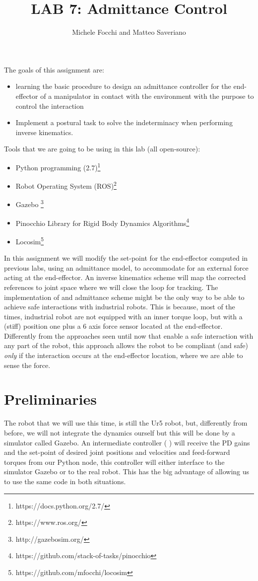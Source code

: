 \documentclass[11pt]{article}
\title{LAB 7: Admittance Control}
\author{Michele Focchi and Matteo Saveriano}
\date{}
\begin{document}
	\maketitle
	\noindent
	The goals of this assignment are:
	\begin{itemize}
		\item learning the basic procedure to design an admittance controller for the end-effector of a manipulator in contact with the environment with the purpose to control the interaction
		\item Implement a postural task to solve the indeterminacy when performing inverse kinematics. 
	\end{itemize}
	
	\noindent
	Tools that we are going to be using in this lab (all open-source):
	\begin{itemize}
		\item Python programming (2.7)\footnote{https://docs.python.org/2.7/}
		\item Robot Operating System (ROS)\footnote{https://www.ros.org/}
		\item Gazebo \footnote{http://gazebosim.org/}
		\item Pinocchio Library for Rigid Body Dynamics Algorithms\footnote{https://github.com/stack-of-tasks/pinocchio}
		\item Locosim\footnote{https://github.com/mfocchi/locosim}
	\end{itemize}
	In this assignment we will modify the set-point for the end-effector computed in previous labs, using an admittance model, to accommodate for an external force acting at the end-effector. An inverse kinematics scheme will map the corrected references to joint space where we will close the loop for tracking. The implementation of and admittance scheme might be the only way to be able to  achieve safe interactions with industrial robots. This is because, most of the times, industrial robot are not equipped with an inner torque loop, but with a (stiff) position one plus a 6 axis force sensor located at the end-effector. Differently from the approaches seen until now that enable a safe interaction with any part of the robot, this approach allows  
	the robot to be compliant (and safe) \textit{only} if the interaction occurs at the end-effector location, where we are able to 
	sense the force. 
	
\section{Preliminaries}
	The robot that we will use this time, is still the  Ur5 robot, but, differently from before, we will not integrate the dynamics ourself but this will be done by a simulator called Gazebo. An intermediate controller ( ) will receive the PD gains and the set-point of desired joint positions and velocities and feed-forward torques from our Python node, this controller will either interface to the simulator Gazebo or to the real robot. This has the big advantage of  allowing us to use the same code in both situations.
\end{document}
